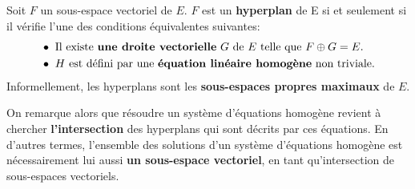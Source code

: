 \subsection*{}
Soit \(F\) un sous-espace vectoriel de \(E\).\+
\(F\) est un \textbf{hyperplan} de E si et seulement si il vérifie l'une des conditions équivalentes suivantes:
\begin{align*}
    &\bullet \text{ Il existe \textbf{une droite vectorielle} \(G\) de \(E\) telle que \(F \oplus G = E\).} \\
    &\bullet \text{ \(H\) est défini par une \textbf{équation linéaire homogène} non triviale.}
\end{align*}
Informellement, les hyperplans sont les \textbf{sous-espaces propres maximaux} de \(E\). \<

On remarque alors que résoudre un système d'équations homogène revient à chercher \textbf{l'intersection} des hyperplans qui sont décrits par ces équations.\<
En d'autres termes, l'ensemble des solutions d'un système d'équations homogène est nécessairement lui aussi \textbf{un sous-espace vectoriel}, en tant qu'intersection de sous-espaces vectoriels.